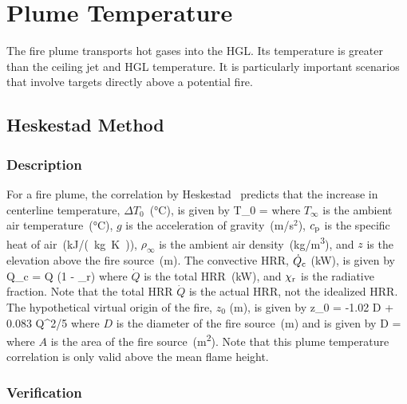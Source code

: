 
\chapter{Plume Temperature}
\label{Plume_Chapter}

The fire plume transports hot gases into the HGL. Its temperature is greater than the ceiling jet and HGL temperature. It is particularly important scenarios that involve targets directly above a potential fire.

\section{Heskestad Method}
\label{sec:Heskestad}

\subsection*{Description}

For a fire plume, the correlation by Heskestad~\cite{SFPE:Heskestad} predicts that the increase in centerline temperature, $\Delta T_0$~(\si{\celsius}), is given by
\be
\Delta T_0 = 
\label{eq:Heskestad}
\ee
where $T_\infty$ is the ambient air temperature~(\si{\celsius}), $g$ is the acceleration of gravity~(m/s$^2$), $c_{\rm p}$ is the specific heat of air~(\si{kJ/(kg.K)}), $\rho_{\infty}$ is the ambient air density~(\si{kg/m^3}), and $z$ is the elevation above the fire source~(\si{m}). The convective HRR, $\dot Q_{\rm c}$ (\si{kW}), is given by
\be
\dot Q_{\rm c} = \dot Q (1 - \chi_{\rm r})
\label{eq:Heskestad_Qc}
\ee
where $\dot Q$ is the total HRR~(\si{kW}), and $\chi_{\rm r}$ is the radiative fraction. Note that the total HRR $\dot Q$ is the actual HRR, not the idealized HRR. The hypothetical virtual origin of the fire, $z_0$ (\si{m}), is given by
\be
z_0 = -1.02 D + 0.083 \dot Q^{2/5}
\label{eq:Heskestad_z0}
\ee
where $D$ is the diameter of the fire source~(\si{m}) and is given by
\be
D = 
\label{eq:Heskestad_D}
\ee
where $A$ is the area of the fire source~(\si{m^2}).
Note that this plume temperature correlation is only valid above the mean flame height.


\clearpage


\subsection*{Verification}

